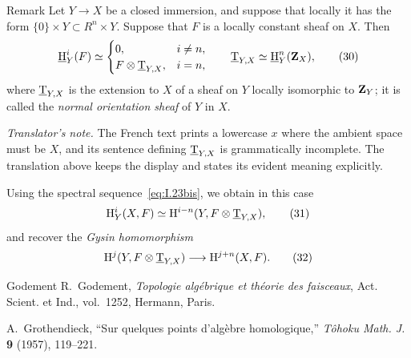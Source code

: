 \begin{sgaremark}{Remark}
Let $Y\to X$ be a closed immersion, and suppose that locally it has the form
$\{0\}\times Y\subset R^n\times Y$. Suppose that $F$ is a locally constant
sheaf on $X$. Then
\begin{equation}
  \mathop{\underline{\mathrm H}}\nolimits_Y^i(F)\simeq
  \begin{cases}
    0,& i\ne n,\\
    F\otimes\underline{\mathrm T}_{Y,X},& i=n,
  \end{cases}
  \qquad
  \underline{\mathrm T}_{Y,X}\simeq\mathop{\underline{\mathrm H}}\nolimits_Y^n(\mathbf Z_X),
  \tag{30}\label{eq:I.30}
\end{equation}
where $\underline{\mathrm T}_{Y,X}$ is the extension to $X$ of a sheaf on $Y$ locally
isomorphic to $\mathbf Z_Y$; it is called the \emph{normal orientation sheaf} of
$Y$ in $X$.
\end{sgaremark}

\noindent\textit{Translator's note.} The French text prints a lowercase
$x$ where the ambient space must be $X$, and its sentence defining
$\underline{\mathrm T}_{Y,X}$ is grammatically incomplete. The translation above keeps the
display and states its evident meaning explicitly.

Using the spectral sequence~\eqref{eq:I.23bis}, we obtain in this case
\begin{equation}
  \mathrm H_Y^i(X,F)
  \simeq
  \mathrm H^{i-n}(Y,F\otimes\underline{\mathrm T}_{Y,X}),
  \tag{31}\label{eq:I.31}
\end{equation}
and recover the \emph{Gysin homomorphism}
\begin{equation}
  \mathrm H^j(Y,F\otimes\underline{\mathrm T}_{Y,X})
  \longrightarrow
  \mathrm H^{j+n}(X,F).
  \tag{32}\label{eq:I.32}
\end{equation}

\begin{thebibliography}{Godement}
R.~Godement, \emph{Topologie alg\'ebrique et th\'eorie des faisceaux},
Act. Scient. et Ind., vol.~1252, Hermann, Paris.

A.~Grothendieck, ``Sur quelques points d'alg\`ebre homologique,''
\emph{T\^ohoku Math. J.} \textbf{9} (1957), 119--221.
\end{thebibliography}
